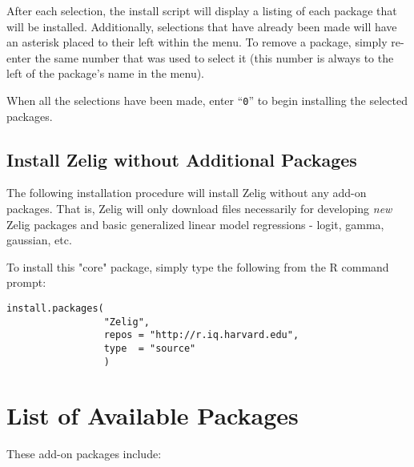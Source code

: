 After each selection, the install script will display a listing of each package
that will be installed. Additionally, selections that have already been made
will have an asterisk placed to their left within the menu. To remove a package,
simply re-enter the same number that was used to select it (this number is
always to the left of the package's name in the menu).

When all the selections have been made, enter ``{\tt 0}'' to begin installing
the selected packages.



\subsection{Install Zelig without Additional Packages}

The following installation procedure will install Zelig without any add-on
packages. That is, Zelig will only download files necessarily for developing
\emph{new} Zelig packages and basic generalized linear model regressions -
logit, gamma, gaussian, etc.

To install this "core" package, simply type the following from the R command
prompt:

\begin{verbatim}
install.packages(
                 "Zelig",
                 repos = "http://r.iq.harvard.edu",
                 type  = "source"
                 )
\end{verbatim}


\section{List of Available Packages}
\label{sec:availablepackages}

These add-on packages include:

